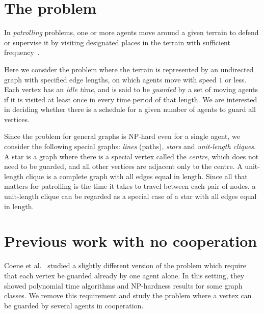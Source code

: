 \newcommand{\kcomment}[1]{{\color{blue}{#1}}}

\section{The problem}

In \emph{patrolling} problems, one or more agents move around a given terrain to defend or supervise it by visiting designated places in the terrain with sufficient frequency~\cite{czyzowicz2011boundary}. 

Here we consider the problem where the terrain is represented by an undirected graph with specified edge lengths, on which agents move with speed $1$ or less.  Each vertex has an \emph{idle time}, and is said to be \emph{guarded} by a set of moving agents if it is visited at least once in every time period of that length.  We are interested in deciding whether there is a schedule for a given number of agents to guard all vertices. 

Since the problem for general graphs is NP-hard even for a single agent, we consider the following special graphs: \emph{lines} (paths), \emph{stars} and \emph{unit-length cliques}. 
A star is a graph where there is a special vertex called the \emph{centre}, 
which does not need to be guarded,
and all other vertices are adjacent only to the centre. 
A unit-length clique is a complete graph with all edges equal in length. 
Since all that matters for patrolling is the time it takes to travel between each pair of nodes, a unit-length clique can be regarded as a special case of a star with all edges equal in length. 

\section{Previous work with no cooperation}

Coene et al.~\cite{coene2011charlemagne} studied a slightly different version of the problem which require that each vertex be guarded already by one agent alone.  In this setting, they showed polynomial time algorithms and NP-hardness results for some graph classes. 
We remove this requirement and study the problem where a vertex can be guarded by several agents in cooperation.


